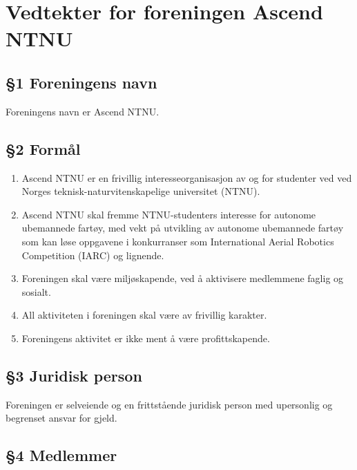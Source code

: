 \documentclass[a4paper,11pt,titlepage]{article}
\newcommand{\orgName}{Ascend NTNU}
\begin{document}
\section*{Vedtekter for foreningen \orgName}

\subsection*{§1 Foreningens navn}
Foreningens navn er \orgName.

\subsection*{§2 Formål}

\begin{enumerate}
\item {\orgName} er en frivillig interesseorganisasjon av og for studenter ved ved Norges teknisk-naturvitenskapelige universitet (NTNU).
\item {\orgName} skal fremme NTNU-studenters interesse for autonome ubemannede fartøy, med vekt på utvikling av autonome ubemannede fartøy som kan løse oppgavene i konkurranser som International Aerial Robotics Competition (IARC) og lignende.
\item Foreningen skal være miljøskapende, ved å aktivisere medlemmene faglig og sosialt.
\item All aktiviteten i foreningen skal være av frivillig karakter.
\item Foreningens aktivitet er ikke ment å være profittskapende.
\end{enumerate}

\subsection*{§3 Juridisk person}
Foreningen er selveiende og en frittstående juridisk person med upersonlig og begrenset ansvar for gjeld.

\subsection*{§4 Medlemmer}
\end{document}
